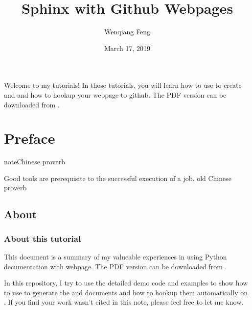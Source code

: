 \documentclass[letterpaper,11pt,english]{sphinxmanual}
\title{Sphinx with Github Webpages}
\date{March 17, 2019}
\author{Wenqiang Feng}
\begin{document}
\pagestyle{empty}
\sphinxmaketitle
\pagestyle{plain}
\sphinxtableofcontents
\pagestyle{normal}
\label{\detokenize{index::doc}}\begin{quote}

\begin{figure}[htbp]
\centering

\noindent{}
\end{figure}
\end{quote}

Welcome to my  tutorials! In those tutorials, you will learn how to use  to create  and  and how to hookup your  webpage to github. The PDF version can be downloaded from .




\chapter{Preface}
\label{\detokenize{preface:preface}}\label{\detokenize{preface:id1}}\label{\detokenize{preface::doc}}
\begin{sphinxadmonition}{note}{Chinese proverb}

Good tools are prerequisite to the successful execution of a job. \textendash{} old Chinese proverb
\end{sphinxadmonition}


\section{About}
\label{\detokenize{preface:about}}

\subsection{About this tutorial}
\label{\detokenize{preface:about-this-tutorial}}
This document is a summary of my valueable experiences in using Python decumentation  with  webpage. The PDF version can be downloaded from . 

In this repository, I try to use the detailed demo code and
examples to show how to use  to generate the  and  documents and how to hookup them automatically on . If you find your work wasn’t cited in this note, please feel free to let me know.
\end{document}
